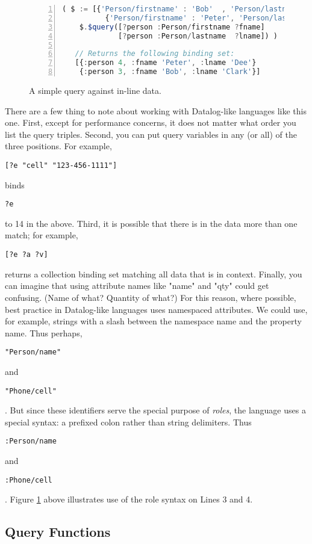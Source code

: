 \documentclass[9pt,letterpaper]{article}
\newcommand{\stt}[1]{\begin{footnotesize}\texttt{#1}\end{footnotesize}}
\begin{document}
\begin{figure}[H]
  \caption{A simple query against in-line data.}
  \label{code:simple-binding-set}
\begin{lstlisting}[language=JavaScript,numberstyle=\scriptsize,basicstyle=\ttfamily\scriptsize,numbers=left,stepnumber=1,breaklines=true]
  ( $ := [{'Person/firstname' : 'Bob'  , 'Person/lastname' : 'Clark'},
          {'Person/firstname' : 'Peter', 'Person/lastname' : 'Dee'}];
    $.$query([?person :Person/firstname ?fname]
             [?person :Person/lastname  ?lname]) )

   // Returns the following binding set:
   [{:person 4, :fname 'Peter', :lname 'Dee'} 
    {:person 3, :fname 'Bob', :lname 'Clark'}]
\end{lstlisting}
\end{figure}

There are a few thing to note about working with Datalog-like languages like this one.
First, except for performance concerns, it does not matter what order you list the query triples.
Second, you can put query variables in any (or all) of the three positions.
For example, \stt{[?e "cell" "123-456-1111"]} binds \stt{?e} to 14 in the above.
Third, it is possible that there is in the data more than one match;
for example, \stt{[?e ?a ?v]} returns a collection binding set matching all data that is in context.
Finally, you can imagine that using attribute names like "name" and "qty" could get confusing. (Name of what? Quantity of what?)
For this reason, where possible, best practice in Datalog-like languages uses namespaced attributes.
We could use, for example, strings with a slash between the namespace name and the property name.
Thus perhaps, \stt{"Person/name"} and \stt{"Phone/cell"}.
But since these identifiers serve the special purpose of \textit{roles}, the language uses a special syntax: a prefixed colon rather than string delimiters.
Thus \stt{:Person/name} and \stt{:Phone/cell}.
Figure \ref{code:simple-binding-set} above illustrates use of the role syntax on Lines 3 and 4.

\subsection{Query Functions}
\end{document}
